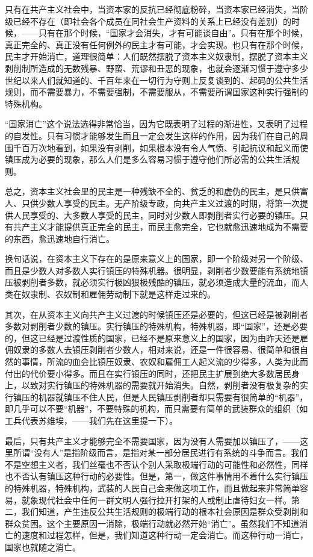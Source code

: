 \documentclass[UTF8, 12pt, a4paper]{ctexrep}
\begin{document}
只有在共产主义社会中，当资本家的反抗已经彻底粉碎，当资本家已经消失，当阶级已经不存在（即社会各个成员在同社会生产资料的关系上已经没有差别）的时候，——只有在那个时候，“国家才会消失，才有可能谈自由”。只有在那个时候，真正完全的、真正没有任何例外的民主才有可能，才会实现。也只有在那个时候，民主才开始消亡，道理很简单：人们既然摆脱了资本主义奴隶制，摆脱了资本主义剥削制所造成的无数残暴、野蛮、荒谬和丑恶的现象，也就会逐渐习惯于遵守多少世纪以来人们就知道的、千百年来在一切行为守则上反复谈到的、起码的公共生活规则，而不需要暴力，不需要强制，不需要服从，不需要所谓国家这种实行强制的特殊机构。

“国家消亡”这个说法选得非常恰当，因为它既表明了过程的渐进性，又表明了过程的自发性。只有习惯才能够发生而且一定会发生这样的作用，因为我们在自己的周围千百万次地看到，如果没有剥削，如果根本没有令人气愤、引起抗议和起义而使镇压成为必要的现象，那么人们是多么容易习惯于遵守他们所必需的公共生活规则。

总之，资本主义社会里的民主是一种残缺不全的、贫乏的和虚伪的民主，是只供富人、只供少数人享受的民主。无产阶级专政，向共产主义过渡的时期，将第一次提供人民享受的、大多数人享受的民主，同时对少数人即剥削者实行必要的镇压。只有共产主义才能提供真正完全的民主，而民主愈完全，它也就愈迅速地成为不需要的东西，愈迅速地自行消亡。

换句话说，在资本主义下存在的是原来意义上的国家，即一个阶级对另一个阶级、而且是少数人对多数人实行镇压的特殊机器。很明显，剥削者少数要能有系统地镇压被剥削者多数，就必须实行极凶狠极残酷的镇压，就必须造成大量的流血，而人类在奴隶制、农奴制和雇佣劳动制下就是这样走过来的。

其次，在从资本主义向共产主义过渡的时候镇压还是必要的，但这已经是被剥削者多数对剥削者少数的镇压。实行镇压的特殊机构，特殊机器，即“国家”，还是必要的，但这已经是过渡性质的国家，已经不是原来意义上的国家，因为由昨天还是雇佣奴隶的多数人去镇压剥削者少数人，相对来说，还是一件很容易、很简单和很自然的事情，所流的血会比镇压奴隶、农奴和雇佣工人起义流的少得多，人类为此而付出的代价要小得多。而且在实行镇压的同时，还把民主扩展到绝大多数居民身上，以致对实行镇压的特殊机器的需要就开始消失。自然，剥削者没有极复杂的实行镇压的机器就镇压不住人民，但是人民镇压剥削者却只需要有很简单的“机器”，即几乎可以不要“机器”，不要特殊的机构，而只需要有简单的武装群众的组织（如工兵代表苏维埃，——我们先在这里提一下）。

最后，只有共产主义才能够完全不需要国家，因为没有人需要加以镇压了，——这里所谓“没有人”是指阶级而言，是指对某一部分居民进行有系统的斗争而言。我们不是空想主义者，我们丝毫也不否认个别人采取极端行动的可能性和必然性，同样也不否认有镇压这种行动的必要性。但是，第一，做这件事情用不着什么实行镇压的特殊机器，特殊机构，武装的人民自己会来做这项工作，而且做起来非常简单容易，就象现代社会中任何一群文明人强行拉开打架的人或制止虐待妇女一样。第二，我们知道，产生违反公共生活规则的极端行动的根本社会原因是群众受剥削和群众贫困。这个主要原因一消除，极端行动就必然开始“消亡”。虽然我们不知道消亡的速度和过程怎样，但是，我们知道这种行动一定会消亡。而这种行动一消亡，国家也就随之消亡。
\end{document}
